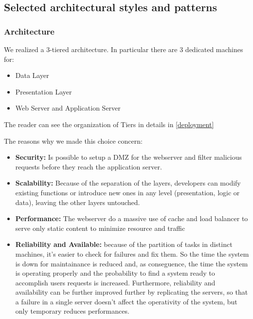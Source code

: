 \newpage

\subsection{Selected architectural styles and patterns}

\subsubsection{Architecture}

We realized a 3-tiered architecture. In particular there are 3 dedicated machines for:

\begin{itemize}
\item Data Layer
\item Presentation Layer
\item Web Server and Application Server
\end{itemize}

The reader can see the organization of Tiers in details in \ref{deployment}
\newline

 The reasons why we made this choice concern:

\begin{itemize}
\item {\textbf{Security:}} Is possible to setup a DMZ for the webserver and filter malicious requests before they reach the application server.
\item {\textbf{Scalability:}} Because of the separation of the layers, developers can modify existing functions or introduce new ones in any level (presentation, logic or data), leaving the other layers untouched.
\item {\textbf{Performance:} The webserver do a massive use of cache and load balancer to serve only static content to minimize resource and traffic}
\item {\textbf{Reliability and Available:}} because of the partition of tasks in distinct machines, it's easier to check for failures and fix them. So the time the system is down for maintainance is reduced and, as conseguence, the time the system is operating properly and the probability to find a system ready to accomplish users requests is increased. Furthermore, reliability and availability can be further improved further by replicating the servers, so that a failure in a single server doesn't affect the operativity of the system,  but only temporary reduces performances.
\end{itemize}


